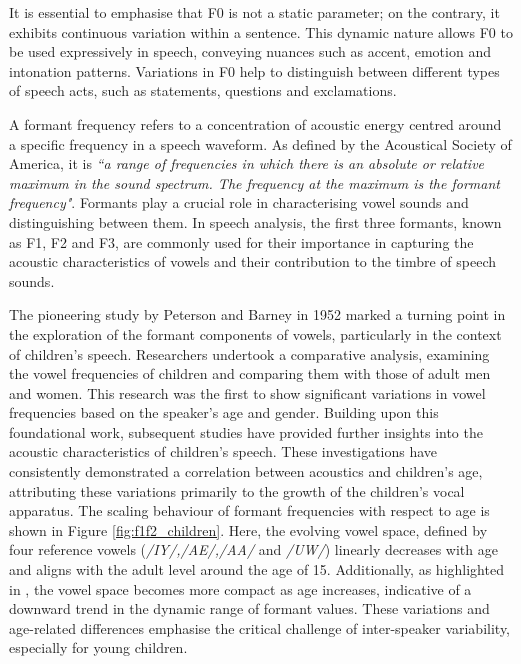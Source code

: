 It is essential to emphasise that F0 is not a static parameter; on the contrary, it exhibits continuous variation within a sentence. This dynamic nature allows F0 to be used expressively in speech, conveying nuances such as accent, emotion and intonation patterns. Variations in F0 help to distinguish between different types of speech acts, such as statements, questions and exclamations.

A formant frequency refers to a concentration of acoustic energy centred around a specific frequency in a speech waveform. As defined by the Acoustical Society of America, it is \textit{``a range of frequencies in which there is an absolute or relative maximum in the sound spectrum. The frequency at the maximum is the formant frequency"}. Formants play a crucial role in characterising vowel sounds and distinguishing between them. In speech analysis, the first three formants, known as F1, F2 and F3, are commonly used for their importance in capturing the acoustic characteristics of vowels and their contribution to the timbre of speech sounds.


The pioneering study by Peterson and Barney in 1952 \cite{first_vowel_study} marked a turning point in the exploration of the formant components of vowels, particularly in the context of children's speech. Researchers undertook a comparative analysis, examining the vowel frequencies of children and comparing them with those of adult men and women. This research was the first to show significant variations in vowel frequencies based on the speaker's age and gender. Building upon this foundational work, subsequent studies \cite{reviewASRchildren,Acoustic_change_children,why_children_speech_no_working} have provided further insights into the acoustic characteristics of children's speech. These investigations have consistently demonstrated a correlation between acoustics and children's age, attributing these variations primarily to the growth of the children's vocal apparatus. The scaling behaviour of formant frequencies with respect to age is shown in Figure \ref{fig:f1f2_children}. Here, the evolving vowel space, defined by four reference vowels (\textit{/IY/,/AE/,/AA/} and \textit{/UW/}) linearly decreases with age and aligns with the adult level around the age of 15. Additionally, as highlighted in \cite{reviewASRchildren}, the vowel space becomes more compact as age increases, indicative of a downward trend in the dynamic range of formant values. These variations and age-related differences emphasise the critical challenge of inter-speaker variability, especially for young children.


